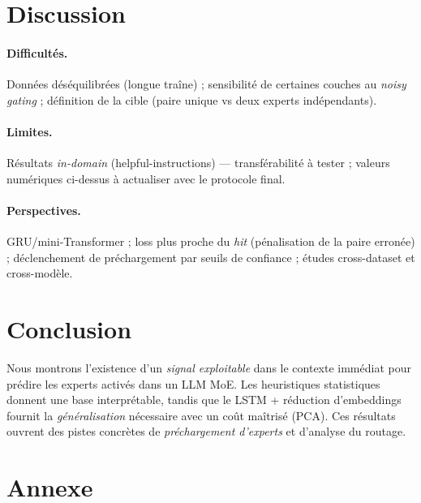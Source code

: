 \documentclass{article}
\begin{document}
\section{Discussion}

\paragraph{Difficultés.} Données déséquilibrées (longue traîne) ; sensibilité de certaines couches au \emph{noisy gating} ; définition de la cible (paire unique vs deux experts indépendants).
\paragraph{Limites.} Résultats \emph{in-domain} (helpful-instructions) — transférabilité à tester ; valeurs numériques ci-dessus à actualiser avec le protocole final.
\paragraph{Perspectives.} GRU/mini-Transformer ; loss plus proche du \emph{hit} (pénalisation de la paire erronée) ; déclenchement de préchargement par seuils de confiance ; études cross-dataset et cross-modèle.

\section{Conclusion}
Nous montrons l’existence d’un \emph{signal exploitable} dans le contexte immédiat pour prédire les experts activés dans un LLM MoE. Les heuristiques statistiques donnent une base interprétable, tandis que le LSTM + réduction d’embeddings fournit la \emph{généralisation} nécessaire avec un coût maîtrisé (PCA). Ces résultats ouvrent des pistes concrètes de \emph{préchargement d’experts} et d’analyse du routage.

\newpage
\printbibliography

\appendix
\section*{Annexe}
\begin{lstlisting}[caption={Estimation de la corrélation d'énergie (placeholder)}, label=lst:energy_estimation]
% CODE (à insérer)
\end{lstlisting}
\end{document}
